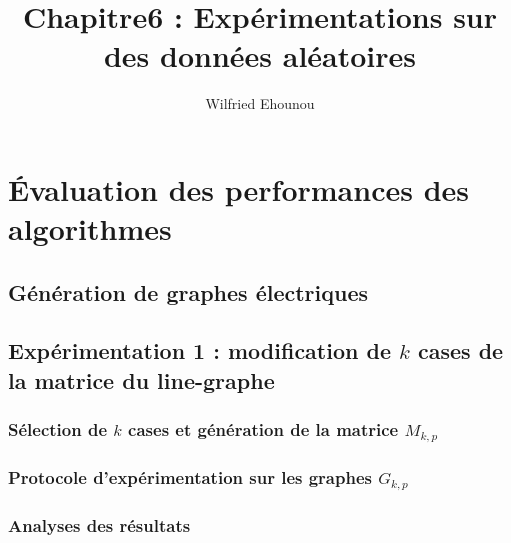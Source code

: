 \documentclass[onecolumn, 12pt]{book}
\title{Chapitre6 : Exp\'erimentations sur des donn\'ees al\'eatoires}
\author{Wilfried Ehounou}
\date{\oldstylenums{\today}}
\begin{document}
\maketitle
\tableofcontents

\chapter{\'Evaluation des performances des algorithmes}
\label{chapitreEvaluation}



\section{G\'en\'eration de graphes \'electriques}
	\label{generationGraphesElectriques}
	

\section{Exp\'erimentation 1 : modification de $k$ cases  de la matrice du line-graphe}
	\label{experimentation1}
	\subsection{S\'election de $k$ cases et g\'en\'eration de la matrice $M_{k,p}$ }
		
	\subsection{Protocole d'exp\'erimentation sur les graphes $G_{k,p}$}
		
	\subsection{Analyses des r\'esultats }
	
\end{document}
